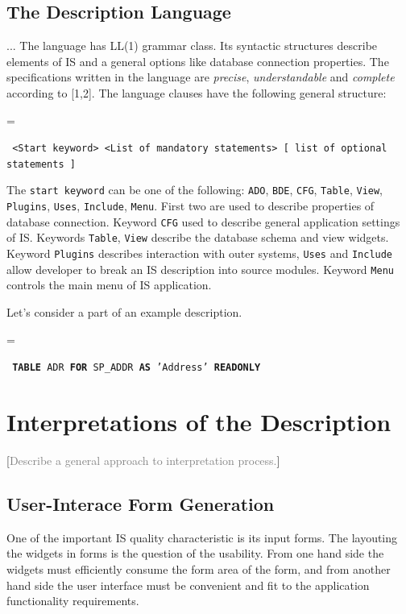 \documentclass[conference]{IEEEtran}
\newcommand{\e}[2][fcolor]{\textcolor{pcolor}{[}\textcolor{#1}{#2}\textcolor{pcolor}{]}}
\newenvironment{asdcode}{\hangindent=\parindent\hangafter=1\par\noindent\small\tt}{}
\begin{document}
\subsection{The Description Language}

... The language has LL(1) grammar class.  Its syntactic structures describe elements of IS and a general options like database connection properties.  The specifications written in the language are \emph{precise}, \emph{understandable} and \emph{complete} according to [1,2].  The language clauses have the following general structure:

\begin{asdcode}%
<Start keyword> <List of mandatory statements> [~list of optional statements~]
\end{asdcode}

The \texttt{start keyword} can be one of the following: \texttt{ADO}, \texttt{BDE}, \texttt{CFG}, \texttt{Table}, \texttt{View}, \texttt{Plugins}, \texttt{Uses}, \texttt{Include}, \texttt{Menu}.  First two are used to describe properties of database connection.  Keyword \texttt{CFG} used to describe general application settings of IS.  Keywords \texttt{Table}, \texttt{View} describe the database schema and view widgets.  Keyword \texttt{Plugins} describes interaction with outer systems, \texttt{Uses} and \texttt{Include} allow developer to break an IS description into source modules.  Keyword \texttt{Menu} controls the main menu of IS application.

Let's consider a part of an example description.

\begin{asdcode}%
\textbf{TABLE} ADR \textbf{FOR} SP\_ADDR \textbf{AS} 'Address' \textbf{READONLY}
\end{asdcode}







\section{Interpretations of the Description}
\label{sec:interpr-descr}

\e[gray]{Describe a general approach to interpretation process.}

\subsection{User-Interace Form Generation}
\label{sec:user-interace-form}
One of the important IS quality characteristic is its input forms.  The layouting the widgets in forms is the question of the usability.  From one hand side the widgets must efficiently consume the form area of the form, and from another hand side the user interface must be convenient and fit to the application functionality requirements.
\end{document}
